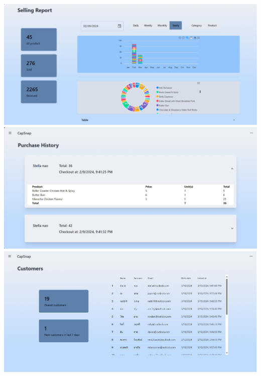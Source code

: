 {
\includegraphics[scale=0.35]{pic/ui/w22.png}
}\\
{
\includegraphics[scale=0.35]{pic/ui/w23.png}
}\\
{
\includegraphics[scale=0.35]{pic/ui/w24.png}
}\\



